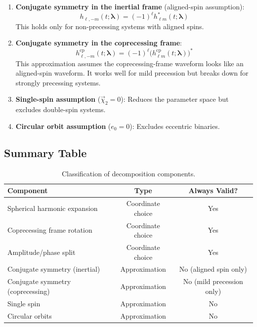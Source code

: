 \documentclass[11pt,a4paper]{article}
\newcommand{\veclambda}{\bm{\lambda}}
\newcommand{\vecchi}{\vec{\chi}}
\begin{document}
\begin{enumerate}
    \item \textbf{Conjugate symmetry in the inertial frame} (aligned-spin assumption):
    \begin{equation}
        h_{\ell,-m}(t; \veclambda) = (-1)^\ell h^*_{\ell m}(t; \veclambda)
        \label{eq:conjugate_inertial}
    \end{equation}
    This holds only for non-precessing systems with aligned spins.

    \item \textbf{Conjugate symmetry in the coprecessing frame}:
    \begin{equation}
        h^{\mathrm{cp}}_{\ell,-m}(t; \veclambda) = (-1)^\ell \bigl(h^{\mathrm{cp}}_{\ell m}(t; \veclambda)\bigr)^*
        \label{eq:conjugate_coprec}
    \end{equation}
    This approximation assumes the coprecessing-frame waveform looks like an aligned-spin waveform. It works well for mild precession but breaks down for strongly precessing systems.

    \item \textbf{Single-spin assumption} ($\vecchi_2 = 0$): Reduces the parameter space but excludes double-spin systems.

    \item \textbf{Circular orbit assumption} ($e_0 = 0$): Excludes eccentric binaries.
\end{enumerate}

\subsection{Summary Table}

\begin{table}[h]
\centering
\begin{tabular}{lcc}
\toprule
\textbf{Component} & \textbf{Type} & \textbf{Always Valid?} \\
\midrule
Spherical harmonic expansion & Coordinate choice & Yes \\
Coprecessing frame rotation & Coordinate choice & Yes \\
Amplitude/phase split & Coordinate choice & Yes \\
\midrule
Conjugate symmetry (inertial) & Approximation & No (aligned spin only) \\
Conjugate symmetry (coprecessing) & Approximation & No (mild precession only) \\
Single spin & Approximation & No \\
Circular orbits & Approximation & No \\
\bottomrule
\end{tabular}
\caption{Classification of decomposition components.}
\label{tab:assumptions}
\end{table}
\end{document}
